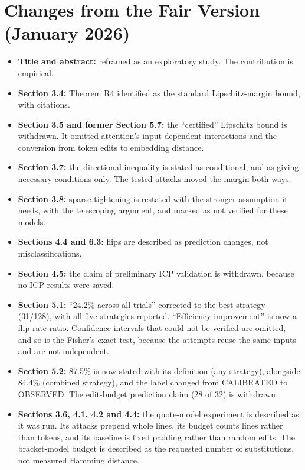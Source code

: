 \documentclass[11pt]{article}
\newcommand{\lab}[1]{{\footnotesize\MakeUppercase{#1}}}
\newcommand{\calibrated}{\lab{calibrated}}
\newcommand{\observed}{\lab{observed}}
\begin{document}
\appendix
\section{Changes from the Fair Version (January 2026)}\label{app:changes}
\begin{itemize}
  \item \textbf{Title and abstract:} reframed as an exploratory study. The contribution is empirical.
  \item \textbf{Section 3.4:} Theorem R4 identified as the standard Lipschitz-margin bound, with citations.
  \item \textbf{Section 3.5 and former Section 5.7:} the ``certified'' Lipschitz bound is withdrawn. It omitted attention's input-dependent interactions and the conversion from token edits to embedding distance.
  \item \textbf{Section 3.7:} the directional inequality is stated as conditional, and as giving necessary conditions only. The tested attacks moved the margin both ways.
  \item \textbf{Section 3.8:} sparse tightening is restated with the stronger assumption it needs, with the telescoping argument, and marked as not verified for these models.
  \item \textbf{Sections 4.4 and 6.3:} flips are described as prediction changes, not misclassifications.
  \item \textbf{Section 4.5:} the claim of preliminary ICP validation is withdrawn, because no ICP results were saved.
  \item \textbf{Section 5.1:} ``24.2\% across all trials'' corrected to the best strategy (31/128), with all five strategies reported. ``Efficiency improvement'' is now a flip-rate ratio. Confidence intervals that could not be verified are omitted, and so is the Fisher's exact test, because the attempts reuse the same inputs and are not independent.
  \item \textbf{Section 5.2:} 87.5\% is now stated with its definition (any strategy), alongside 84.4\% (combined strategy), and the label changed from \calibrated{} to \observed. The edit-budget prediction claim (28 of 32) is withdrawn.
  \item \textbf{Sections 3.6, 4.1, 4.2 and 4.4:} the quote-model experiment is described as it was run. Its attacks prepend whole lines, its budget counts lines rather than tokens, and its baseline is fixed padding rather than random edits. The bracket-model budget is described as the requested number of substitutions, not measured Hamming distance.

\end{itemize}
\end{document}
